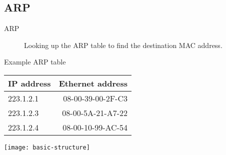 \subsection{ARP}

\begin{frame}
  \begin{description}
  \item[ARP] Looking up the ARP table to find the destination MAC address.
  \end{description}
  \begin{minipage}{.5\linewidth}
    \begin{iblock}{Example ARP table}
      {\centering\ttfamily
        \begin{tabular}{lr}
          \toprule
          \textrm{IP address} & \textrm{Ethernet address}\\\midrule
          223.1.2.1 & 08-00-39-00-2F-C3\\
          223.1.2.3 & 08-00-5A-21-A7-22\\
          223.1.2.4 & 08-00-10-99-AC-54\\\bottomrule
        \end{tabular}}
    \end{iblock}
  \end{minipage}\quad
  \begin{minipage}{.4\linewidth}
    \texttt{[image: basic-structure]}
  \end{minipage}
\end{frame}

